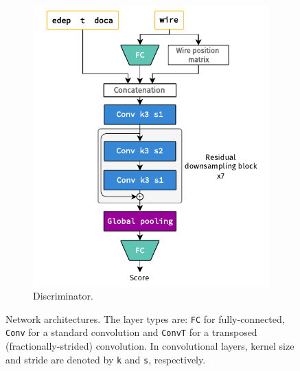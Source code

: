 \begin{figure}
    \begin{subfigure}[t]{0.49\textwidth}
        \centering
        \includegraphics[width=\textwidth]{chapter4/network_architectures_disc.drawio.pdf}
        \hspace{-1cm} %
        \caption{Discriminator.}
    \end{subfigure}
    \caption{Network architectures. The layer types are: \texttt{FC} for fully-connected, \texttt{Conv} for a standard convolution and \texttt{ConvT}
    for a transposed (fractionally-strided) convolution. In convolutional layers, kernel size and stride are denoted by \texttt{k} and \texttt{s}, respectively.}
    \label{fig:architectures}
\end{figure}

